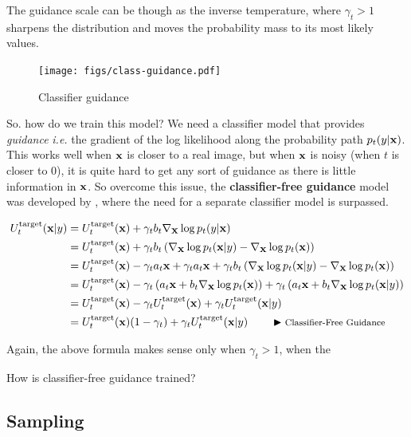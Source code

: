 \documentclass[a4paper, 11pt]{article}
\begin{document}
The guidance scale can be though as the inverse temperature, where $\gamma_t > 1$ sharpens the distribution and moves the probability mass to its most likely values.

\begin{figure}[ht]
    \centering
    \texttt{[image: figs/class-guidance.pdf]}
    \caption{Classifier guidance}
    \label{fig:class_guidance}
\end{figure}


So. how do we train this model? We need a classifier model that provides \emph{guidance} \textit{i.e.} the gradient of the log likelihood along the probability path $p_t(y | \mbox{$\mbox{$\mathbf{x}$}$})$. This works well when $\mbox{$\mbox{$\mathbf{x}$}$}$ is closer to a real image, but when $\mbox{$\mbox{$\mathbf{x}$}$}$ is noisy  (when $t$ is closer to 0), it is quite hard to get any sort of guidance as there is little information in $\mbox{$\mbox{$\mathbf{x}$}$}$. So overcome this issue, the \textbf{classifier-free guidance} model was developed by \cite{ho2022classifier}, where the need for a separate classifier model is surpassed. 

\begin{align}
    U_t^{\text{target}}(\mbox{$\mbox{$\mathbf{x}$}$} | y) &= U_t^{\text{target}}(\mbox{$\mbox{$\mathbf{x}$}$}) + \gamma_t b_t \nabla_{\mbox{$\mbox{$\mathbf{x}$}$}}\log p_t( y | \mbox{$\mbox{$\mathbf{x}$}$}) \\
    &= U_t^{\text{target}}(\mbox{$\mbox{$\mathbf{x}$}$}) + \gamma_t b_t \left ( \nabla_{\mbox{$\mbox{$\mathbf{x}$}$}}\log p_t( \mbox{$\mbox{$\mathbf{x}$}$} | y) - \nabla_{\mbox{$\mbox{$\mathbf{x}$}$}}\log p_t(\mbox{$\mbox{$\mathbf{x}$}$}) \right ) \\
    &= U_t^{\text{target}}(\mbox{$\mbox{$\mathbf{x}$}$}) - \gamma_t a_t \mbox{$\mbox{$\mathbf{x}$}$} + \gamma_t a_t \mbox{$\mbox{$\mathbf{x}$}$} + \gamma_t b_t \left ( \nabla_{\mbox{$\mbox{$\mathbf{x}$}$}}\log p_t( \mbox{$\mbox{$\mathbf{x}$}$} | y) - \nabla_{\mbox{$\mbox{$\mathbf{x}$}$}}\log p_t(\mbox{$\mbox{$\mathbf{x}$}$}) \right ) \\
    &= U_t^{\text{target}}(\mbox{$\mbox{$\mathbf{x}$}$}) - \gamma_t \left (  a_t \mbox{$\mbox{$\mathbf{x}$}$} + b_t \nabla_{\mbox{$\mbox{$\mathbf{x}$}$}}\log p_t(\mbox{$\mbox{$\mathbf{x}$}$}) \right ) + \gamma_t \left ( a_t \mbox{$\mbox{$\mathbf{x}$}$} + b_t \nabla_{\mbox{$\mbox{$\mathbf{x}$}$}}\log p_t( \mbox{$\mbox{$\mathbf{x}$}$} | y)  \right ) \\
    &= U_t^{\text{target}}(\mbox{$\mbox{$\mathbf{x}$}$}) - \gamma_t U_t^{\text{target}}(\mbox{$\mbox{$\mathbf{x}$}$}) + \gamma_t U_t^{\text{target}}(\mbox{$\mbox{$\mathbf{x}$}$} | y) \\
    &= U_t^{\text{target}}(\mbox{$\mbox{$\mathbf{x}$}$}) (1 - \gamma_t) + \gamma_t U_t^{\text{target}}(\mbox{$\mbox{$\mathbf{x}$}$} | y) \qquad \blacktriangleright\text{\footnotesize Classifier-Free Guidance}\label{eq:class-free-guidance}
\end{align}

Again, the above formula makes sense only when $\gamma_t > 1$, when the 

How is classifier-free guidance trained?

\subsection{Sampling}
\end{document}
